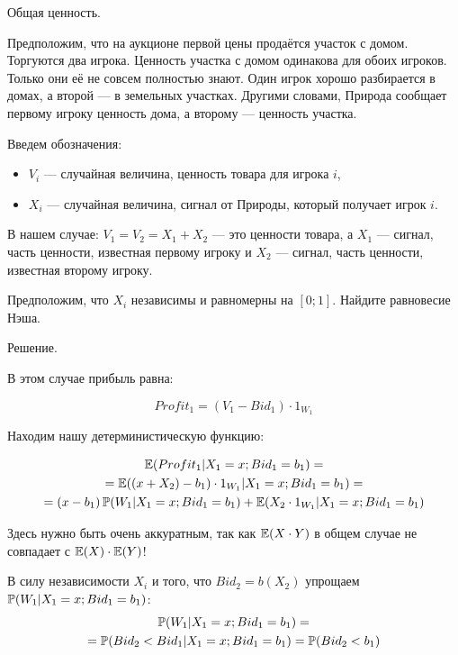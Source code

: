 \begin{myex} Общая ценность.

Предположим, что на аукционе первой цены продаётся участок с домом. Торгуются два игрока. Ценность участка с домом одинакова для обоих игроков. Только они её не совсем полностью знают. Один игрок хорошо разбирается в домах, а второй — в земельных участках. Другими словами, Природа сообщает первому игроку ценность дома, а второму — ценность участка.

Введем обозначения:

\begin{itemize}
\item $ V_{i} $ — случайная величина, ценность товара для игрока $ i $,
\item $ X_{i} $ — случайная величина, сигнал от Природы, который получает игрок $ i $.
\end{itemize}

В нашем случае: $ V_{1}=V_{2}=X_{1}+X_{2} $ — это ценности товара, а $ X_{1} $ — сигнал, часть ценности, известная первому игроку и $ X_{2} $ — сигнал, часть ценности, известная второму игроку.

Предположим, что $ X_{i} $ независимы и равномерны на $ [0;1] $. Найдите равновесие Нэша.

Решение.

В этом случае прибыль равна:

\begin{equation}
Profit_{1}=(V_{1}-Bid_{1})\cdot 1_{W_{1}}
\end{equation}

Находим нашу детерминистическую функцию:

\begin{multline}
\E(Profit_{1}|X_{1}=x; Bid_{1}=b_{1})=\\
=\E((x+X_{2})-b_{1})\cdot 1_{W_{1}}|X_{1}=x; Bid_{1}=b_{1})=\\
=(x-b_{1})\P(W_{1}|X_{1}=x; Bid_{1}=b_{1})+\E(X_{2}\cdot 1_{W_{1}}|X_{1}=x; Bid_{1}=b_{1})
\end{multline}


Здесь нужно быть очень аккуратным, так как $ \E(X\cdot Y) $ в общем случае не совпадает с $ \E(X)\cdot \E(Y) $!

В силу независимости $ X_{i} $ и того, что $ Bid_{2}=b(X_{2}) $ упрощаем $\P(W_{1}|X_{1}=x ; Bid_{1}=b_{1})$:
\begin{multline}
\P(W_{1}|X_{1}=x; Bid_{1}=b_{1})=\\
=\P(Bid_{2}<Bid_{1}|X_{1}=x; Bid_{1}=b_{1})=\P(Bid_{2}<b_{1})
\end{multline}


\end{myex}

